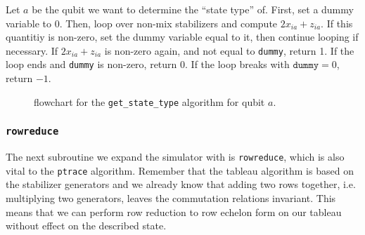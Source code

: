 \begin{alg}\label{alg:get_state_type}
  Let $a$ be the qubit we want to determine the \enquote{state type} of. First,
  set a dummy variable to $0$. Then, loop over non-mix stabilizers and compute
  $2x_{ia} + z_{ia}$. If this quantitiy is non-zero, set the dummy variable
  equal to it, then continue looping if necessary. If $2x_{ia}+z_{ia}$ is
  non-zero again, and not equal to \verb|dummy|, return 1. If the loop ends and
  \verb|dummy| is non-zero, return 0. If the loop breaks with
  $\texttt{dummy}=0$, return $-1$.
\end{alg}
%
\begin{figure}[H]
  \centering
  
  \caption{flowchart for the \texttt{get\_state\_type} algorithm for qubit $a$.}
  \label{fig:statetype-diag}
\end{figure}

\subsubsection{\texttt{rowreduce}}
The next subroutine we expand the simulator with is \texttt{rowreduce}, which
is also vital to the \verb|ptrace| algorithm. Remember that the tableau
algorithm is based on the stabilizer generators and we already know that adding
two rows together, i.e. multiplying two generators, leaves the commutation
relations invariant. This means that we can perform row reduction to row
echelon form on our tableau without effect on the described state.

